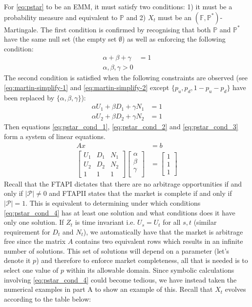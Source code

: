 \documentclass{article}
\begin{document}
For \ref{eq:pstar} to be an EMM, it must satisfy two conditions: 1) it must be a probability measure and equivalent to $\mathbb{P}$ and 2) $X_t$ must be an $(\mathbb{F},\mathbb{P}^*)$-Martingale. The first condition is confirmed by recognising that both $\mathbb{P}$ and $\mathbb{P}^*$ have the same null set (the empty set $\emptyset$) as well as enforcing the following condition:
\begin{align}
    \alpha + \beta + \gamma &= 1 \label{eq:pstar_cond_1} \\
    \alpha,\beta,\gamma>0 \nonumber
\end{align}
The second condition is satisfied when the following constraints are observed (see \ref{eq:martin-simplify-1} and \ref{eq:martin-simplify-2} except $\{p_u,p_d,1-p_u-p_d\}$ have been replaced by $\{\alpha,\beta,\gamma\}$):
\begin{align}
    \alpha U_1 + \beta D_1 + \gamma N_1 &= 1 \label{eq:pstar_cond_2} \\
    \alpha U_2 + \beta D_2 + \gamma N_2 &= 1 \label{eq:pstar_cond_3}
\end{align}
Then equations \ref{eq:pstar_cond_1}, \ref{eq:pstar_cond_2} and \ref{eq:pstar_cond_3} form a system of linear equations.
\begin{align}
    Ax &= b \nonumber\\
\left[\begin{array}{cccc} \label{eq:pstar_cond_4}
U_1 & D_1 & N_1\\
U_2 & D_2 & N_2\\
1 & 1 & 1
\end{array} \right]
\left[\begin{array}{c}
\alpha\\
\beta\\
\gamma\\
\end{array} \right] &= \left[\begin{array}{c}
1\\
1\\
1
\end{array} \right]
\end{align}
Recall that the FTAPI dictates that there are no arbitrage opportunities if and only if $|\mathcal{P}|\neq0$ and FTAPII states that the market is complete if and only if $|\mathcal{P}|=1$. This is equivalent to determining under which conditions \ref{eq:pstar_cond_4} has at least one solution and what conditions does it have only one solution. If $Z_t$ is time invariant i.e. $U_s=U_t$ for all $s,t$ (similar requirement for $D_t$ and $N_t$), we automatically have that the market is arbitrage free since the matrix $A$ contains two equivalent rows which results in an infinite number of solutions. This set of solutions will depend on a parameter (let's denote it $p$) and therefore to enforce market completeness, all that is needed is to select one value of $p$ within its allowable domain. Since symbolic calculations involving \ref{eq:pstar_cond_4} could become tedious, we have instead taken the numerical examples in part A to show an example of this. Recall that $X_t$ evolves according to the table below:
\end{document}
